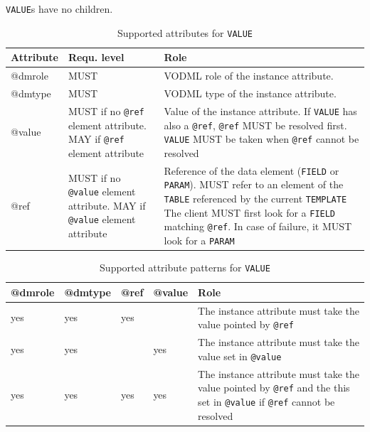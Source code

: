 \documentclass[11pt,a4paper]{ivoa}
\begin{document}
 \texttt{VALUE}s have no children. 

\begin{table}[ht!]
     \begin{tabular}{|p{1.5cm}|p{4cm}|p{7cm}|}
       \hline Attribute & Requ. level & Role\\
       \hline  
      @dmrole   & MUST & VODML role of the instance attribute.\\       
       \hline 
      @dmtype   & MUST & VODML type of the instance attribute.\\
       \hline  
      @value  & MUST if no \texttt{@ref } element attribute. \newline MAY if \texttt{@ref} element attribute 
                    & Value of the instance attribute. 
                     \newline If  \texttt{VALUE} has also a \texttt{@ref}, \texttt{@ref} MUST be resolved first.
                     \texttt{VALUE}  MUST be taken when \texttt{@ref} cannot be resolved \\
        \hline
       @ref  & MUST if no \texttt{@value} element attribute. 
                     \newline MAY if \texttt{@value} element attribute 
                & Reference of the data element (\texttt{FIELD} or \texttt{PARAM}).  
                    \newline MUST refer to an element of the \texttt{TABLE}  referenced by the current     
                    \texttt{TEMPLATE}                    
                    \newline The client MUST first look for a \texttt{FIELD} matching \texttt{@ref}. 
                    \newline In case of failure, it MUST look for a \texttt{PARAM}
                    \\
       \hline 
     \end{tabular}
     \caption{Supported attributes for  \texttt{VALUE}} 
 \end{table}

\begin{table}[ht!]
  \begin{tabular}{|p{1.5cm}|p{1.5cm}|p{1.5cm}|p{1.5cm}|p{5cm}|}
    \hline @dmrole  &  @dmtype &  @ref &  @value &  Role\\
    \hline  yes & yes &  yes & & The instance attribute must take the value pointed by \texttt{@ref} \\
    \hline  yes & yes &  & yes & The instance attribute must take the value set in  \texttt{@value} \\
    \hline  yes & yes &  yes & yes 
              & The instance attribute must take the value pointed by \texttt{@ref} 
                  \newline and the this set in  \texttt{@value} if \texttt{@ref} cannot be resolved\\
    \hline 
  \end{tabular}
  \caption{Supported attribute patterns for  \texttt{VALUE}} 
 \end{table}
\end{document}
